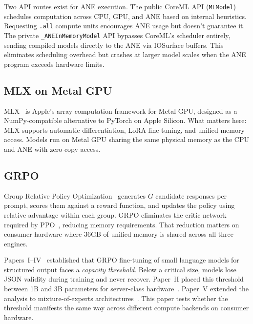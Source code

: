 \documentclass[11pt]{article}
\begin{document}
Two API routes exist for ANE execution.  The public CoreML API (\texttt{MLModel}) schedules computation across CPU, GPU, and ANE based on internal heuristics.  Requesting \texttt{.all} compute units encourages ANE usage but doesn't guarantee it.  The private \texttt{\_ANEInMemoryModel} API bypasses CoreML's scheduler entirely, sending compiled models directly to the ANE via IOSurface buffers.  This eliminates scheduling overhead but crashes at larger model scales when the ANE program exceeds hardware limits.

\subsection{MLX on Metal GPU}

MLX~\cite{hannun2023mlx} is Apple's array computation framework for Metal GPU, designed as a NumPy-compatible alternative to PyTorch on Apple Silicon.  What matters here: MLX supports automatic differentiation, LoRA fine-tuning, and unified memory access.  Models run on Metal GPU sharing the same physical memory as the CPU and ANE with zero-copy access.

\subsection{GRPO}

Group Relative Policy Optimization~\cite{grpo} generates $G$ candidate responses per prompt, scores them against a reward function, and updates the policy using relative advantage within each group.  GRPO eliminates the critic network required by PPO~\cite{schulman2017ppo}, reducing memory requirements.  That reduction matters on consumer hardware where 36GB of unified memory is shared across all three engines.

Papers~I--IV~\cite{maloney2025deploymentgap,maloney2025capacity,maloney2025agentslobench,maloney2025dynamics} established that GRPO fine-tuning of small language models for structured output faces a \emph{capacity threshold}.  Below a critical size, models lose JSON validity during training and never recover.  Paper~II placed this threshold between 1B and 3B parameters for server-class hardware~\cite{maloney2025capacity}.  Paper~V extended the analysis to mixture-of-experts architectures~\cite{maloney2025moe}.  This paper tests whether the threshold manifests the same way across different compute backends on consumer hardware.

\end{document}
